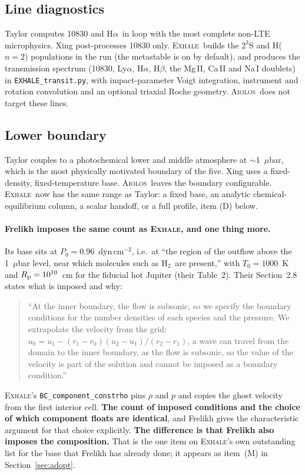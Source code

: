 \documentclass[english,a4paper]{my_memo}
\newcommand{\Rp}{R_{\rm p}}
\newcommand{\EXHALE}{\textsc{Exhale}}
\newcommand{\AIOLOS}{\textsc{Aiolos}}
\newcommand{\Lya}{Ly$\alpha$}
\newcommand{\Ha}{H$\alpha$}
\newcommand{\Htwo}{\ensuremath{\mathrm{H}_2}}
\begin{document}
\subsection{Line diagnostics}
Taylor computes 10830 and \Ha\ in loop with the most complete non-LTE
microphysics. Xing post-processes 10830 only. \EXHALE\ builds the $2^3$S and
H($n{=}2$) populations in the run (the metastable is on by default), and
produces the transmission spectrum (10830, \Lya, \Ha, H$\beta$, the Mg\,II,
Ca\,II and Na\,I doublets) in \texttt{EXHALE\_transit.py}, with
impact-parameter Voigt integration, instrument and rotation convolution and an
optional triaxial Roche geometry. \AIOLOS\ does not target these lines.

\subsection{Lower boundary}
\label{sec:lowerbc}
Taylor couples to a photochemical lower and middle atmosphere at
$\sim$1~$\mu$bar, which is the most physically motivated boundary of the five.
Xing uses a fixed-density, fixed-temperature base. \AIOLOS\ leaves the boundary
configurable. \EXHALE\ now has the same range as Taylor: a fixed base, an
analytic chemical-equilibrium column, a scalar handoff, or a full profile,
item (D) below.

\paragraph{Frelikh imposes the same count as \EXHALE, and one thing more.}
Its base sits at $P_0 = 0.96$~dyn\,cm$^{-2}$, i.e.\ at ``the region of the
outflow above the 1~$\mu$bar level, near which molecules such as \Htwo\ are
present,'' with $T_0 = 1000$~K and $\Rp = 10^{10}$~cm for the fiducial hot
Jupiter (their Table~2). Their Section~2.8 states what is imposed and why:
\begin{quote}\small
``At the inner boundary, the flow is subsonic, so we specify the boundary
conditions for the number densities of each species and the pressure. We
extrapolate the velocity from the grid: $u_0 = u_1 - (r_1-r_0)(u_2-u_1)/
(r_2-r_1)$, a wave can travel from the domain to the inner boundary, as the
flow is subsonic, so the value of the velocity is part of the solution and
cannot be imposed as a boundary condition.''
\end{quote}
\EXHALE's \texttt{BC\_component\_constrho} pins $\rho$ and $p$ and copies the
ghost velocity from the first interior cell. \textbf{The count of imposed
conditions and the choice of which component floats are identical}, and
Frelikh gives the characteristic argument for that choice explicitly.
\textbf{The difference is that Frelikh also imposes the composition.} That is
the one item on \EXHALE's own outstanding list for the base that Frelikh has
already done; it appears as item~(M) in Section~\ref{sec:adopt}.
\end{document}
